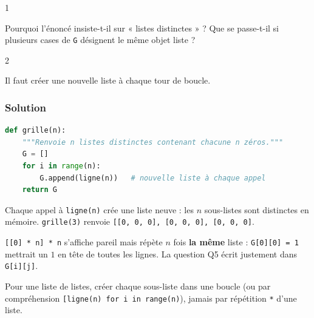 \documentclass[11pt,a4paper]{article}
\begin{document}
\begin{indication}{1}

Pourquoi l'énoncé insiste-t-il sur « listes distinctes » ? Que se passe-t-il si plusieurs cases de \texttt{G} désignent le même objet liste ?

\end{indication}

\begin{indication}{2}

Il faut créer une nouvelle liste à chaque tour de boucle.

\end{indication}

\hypertarget{solution-3}{%
\subsubsection{Solution}\label{solution-3}}

\begin{lstlisting}[language=Python]
def grille(n):
    """Renvoie n listes distinctes contenant chacune n zéros."""
    G = []
    for i in range(n):
        G.append(ligne(n))   # nouvelle liste à chaque appel
    return G
\end{lstlisting}

Chaque appel à \texttt{ligne(n)} crée une liste neuve : les \(n\) sous-listes sont distinctes en mémoire. \texttt{grille(3)} renvoie \texttt{{[}{[}0,\allowbreak{}\ 0,\allowbreak{}\ 0{]}\allowbreak{},\allowbreak{}\ {[}0,\allowbreak{}\ 0,\allowbreak{}\ 0{]}\allowbreak{},\allowbreak{}\ {[}0,\allowbreak{}\ 0,\allowbreak{}\ 0{]}\allowbreak{}{]}\allowbreak{}}.

\begin{piege}

\texttt{{[}{[}0{]}\ *\ n{]}\ *\ n} s'affiche pareil mais répète \(n\) fois \textbf{la même} liste : \texttt{G{[}0{]}{[}0{]}\ =\ 1} mettrait un \(1\) en tête de toutes les lignes. La question Q5 écrit justement dans \texttt{G{[}i{]}{[}j{]}}.

\end{piege}

\begin{methode}

Pour une liste de listes, créer chaque sous-liste dans une boucle (ou par compréhension \texttt{{[}ligne(\allowbreak{}n)\allowbreak{}\ for\ i\ in\ range(\allowbreak{}n)\allowbreak{}{]}\allowbreak{}}), jamais par répétition \texttt{*} d'une liste.

\end{methode}
\end{document}
